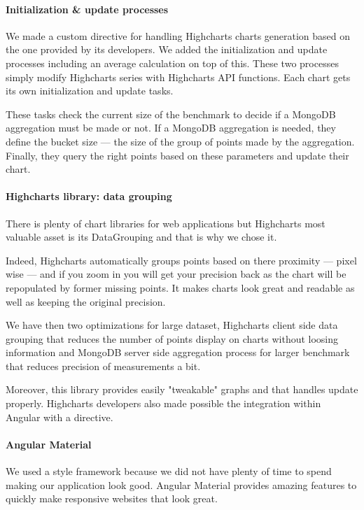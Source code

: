\documentclass[a4paper,11pt]{report}
\begin{document}
\paragraph{Initialization \& update processes}

We made a custom directive for handling Highcharts charts generation based on the one provided by its developers. We added the initialization and update processes including an average calculation on top of this. These two processes simply modify Highcharts series with Highcharts API functions. Each chart gets its own initialization and update tasks.

These tasks check the current size of the benchmark to decide if a MongoDB aggregation must be made or not. If a MongoDB aggregation is needed, they define the bucket size --- the size of the group of points made by the aggregation. Finally, they query the right points based on these parameters and update their chart.

\paragraph{Highcharts library: data grouping}\label{data_grouping} There is plenty of chart libraries for web applications but Highcharts most valuable asset is its DataGrouping and that is why we chose it.

Indeed, Highcharts automatically groups points based on there proximity --- pixel wise --- and if you zoom in you will get your precision back as the chart will be repopulated by former missing points. It makes charts look great and readable as well as keeping the original precision.

We have then two optimizations for large dataset, Highcharts client side data grouping that reduces the number of points display on charts without loosing information and MongoDB server side aggregation process for larger benchmark that reduces precision of measurements a bit.

Moreover, this library provides easily "tweakable" graphs and that handles update properly. Highcharts developers also made possible the integration within Angular with a directive.

\paragraph{Angular Material} We used a style framework because we did not have plenty of time to spend making our application look good. Angular Material provides amazing features to quickly make responsive websites that look great.
\end{document}
